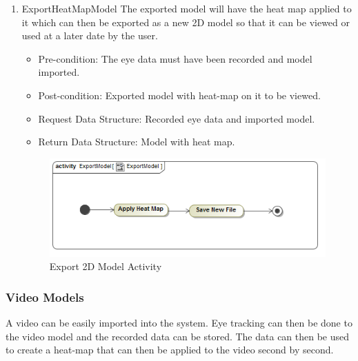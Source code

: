 \begin{enumerate}
		\item{ExportHeatMapModel}
		The exported model will have the heat map applied to it which can then be exported as a new 2D model so that it can be viewed or used at a later date by the user.  
		\begin{itemize}
			\item Pre-condition: The eye data must have been recorded and model imported.
			\item Post-condition: Exported model with heat-map on it to be viewed.
			\item Request Data Structure: Recorded eye data and imported model.
			\item Return Data Structure: Model with heat map.
		\end{itemize}
		
		\begin{figure}[!ht]
			\centering
			\includegraphics[scale=0.5]{Diagrams/Activity_Diagram__ExportModel__ExportModel.png}
			\caption{Export 2D Model Activity}
		\end{figure}
	
	\end{enumerate}
		
		
	\subsubsection{Video Models}
	A video can be easily imported into the system. Eye tracking can then be done to the video model and the recorded data can be stored. The data can then be used to create a heat-map that can then be applied to the video second by second.
	\newline
	
